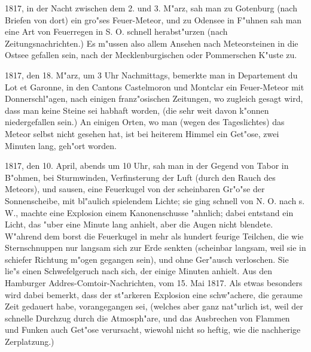\documentclass[a4paper, 11pt, oneside, polutonikogreek, german]{article}
\begin{document}
1817, in der Nacht zwischen dem 2. und 3. M"arz, sah man zu Gotenburg (nach Briefen von dort) ein gro"ses Feuer-Meteor, und zu Odensee in F"uhnen sah man eine Art von Feuerregen in S. O. schnell herabst"urzen (nach Zeitungsnachrichten.) Es m"ussen also allem Ansehen nach Meteorsteinen in die Ostsee gefallen sein, nach der Mecklenburgischen oder Pommerschen K"uste zu.

1817, den 18. M"arz, um 3 Uhr Nachmittags, bemerkte man in Departement du Lot et Garonne, in den Cantons Castelmoron und Montclar ein Feuer-Meteor mit Donnerschl"agen, nach einigen franz"osischen Zeitungen, wo zugleich gesagt wird, dass man keine Steine sei habhaft worden, (die sehr weit davon k"onnen niedergefallen sein.) An einigen Orten, wo man (wegen des Tageslichtes) das Meteor selbst nicht gesehen hat, ist bei heiterem Himmel ein Get"ose, zwei Minuten lang, geh"ort worden.

1817, den 10. April, abends um 10 Uhr, sah man in der Gegend von Tabor in B"ohmen, bei Sturmwinden, Verfinsterung der Luft (durch den Rauch des Meteors), und sausen, eine Feuerkugel von der scheinbaren Gr"o"se der Sonnenscheibe, mit bl"aulich spielendem Lichte; sie ging schnell von N. O. nach s. W., machte eine Explosion einem Kanonenschusse "ahnlich; dabei entstand ein Licht, das "uber eine Minute lang anhielt, aber die Augen nicht blendete. W"ahrend dem borst die Feuerkugel in mehr als hundert feurige Teilchen, die wie Sternschnuppen nur langsam sich zur Erde senkten (scheinbar langsam, weil sie in schiefer Richtung m"ogen gegangen sein), und ohne Ger"ausch verloschen. Sie lie"s einen Schwefelgeruch nach sich, der einige Minuten anhielt. Aus den Hamburger Addres-Comtoir-Nachrichten, vom 15. Mai 1817. Als etwas besonders wird dabei bemerkt, dass der st"arkeren Explosion eine schw"achere, die geraume Zeit gedauert habe, vorangegangen sei, (welches aber ganz nat"urlich ist, weil der schnelle Durchzug durch die Atmosph"are, und das Ausbrechen von Flammen und Funken auch Get"ose verursacht, wiewohl nicht so heftig, wie die nachherige Zerplatzung.)
\end{document}
